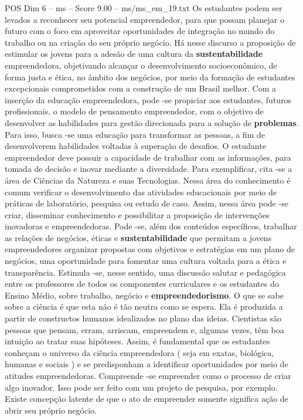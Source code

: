 \begin{textsample}{POS Dim 6 – ms – Score 9.00 – ms/ms\_em\_19.txt}
Os estudantes podem ser levados a reconhecer seu potencial empreendedor, para que possam planejar o futuro com o foco em aproveitar oportunidades de integração no mundo do trabalho ou na criação do seu próprio negócio.
Há nesse discurso a proposição de estimular os jovens para a adesão de uma cultura da \textbf{sustentabilidade} empreendedora, objetivando alcançar o desenvolvimento socioeconômico, de forma justa e ética, no âmbito dos negócios, por meio da formação de estudantes excepcionais comprometidos com a construção de um Brasil melhor.
Com a inserção da educação empreendedora, pode -se propiciar aos estudantes, futuros profissionais, o modelo de pensamento empreendedor, com o objetivo de desenvolver as habilidades para gestão direcionada para a solução de \textbf{problemas}.
Para isso, busca -se uma educação para transformar as pessoas, a fim de desenvolverem habilidades voltadas à superação de desafios.
O estudante empreendedor deve possuir a capacidade de trabalhar com as informações, para tomada de decisão e inovar mediante a diversidade.
Para exemplificar, cita -se a área de Ciências da Natureza e suas Tecnologias.
Nessa área do conhecimento é comum verificar o desenvolvimento das atividades educacionais por meio de práticas de laboratório, pesquisa ou estudo de caso.
Assim, nessa área pode -se criar, disseminar conhecimento e possibilitar a proposição de intervenções inovadoras e empreendedoras.
Pode -se, além dos conteúdos específicos, trabalhar as relações de negócios, éticas e \textbf{sustentabilidade} que permitam a jovens empreendedores organizar propostas com objetivos e estratégias em um plano de negócios, uma oportunidade para fomentar uma cultura voltada para a ética e transparência.
Estimula -se, nesse sentido, uma discussão salutar e pedagógica entre os professores de todos os componentes curriculares e os estudantes do Ensino Médio, sobre trabalho, negócio e \textbf{empreendedorismo}.
O que se sabe sobre a ciência é que esta não é tão neutra como se espera.
Ela é produzida a partir de constructos humanos idealizados no plano das ideias.
Cientistas são pessoas que pensam, erram, arriscam, empreendem e, algumas vezes, têm boa intuição ao tratar suas hipóteses.
Assim, é fundamental que os estudantes conheçam o universo da ciência empreendedora ( seja em exatas, biológica, humanas e sociais ) e se predisponham a identificar oportunidades por meio de atitudes empreendedoras.
Compreende -se empreender como o processo de criar algo inovador.
Isso pode ser feito com um projeto de pesquisa, por exemplo.
Existe concepção latente de que o ato de empreender somente significa ação de abrir seu próprio negócio.

\end{textsample}
